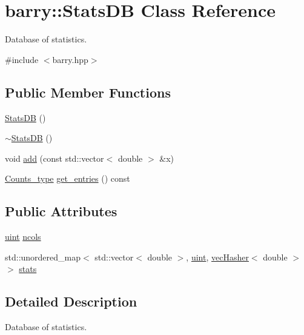 \hypertarget{classbarry_1_1_stats_d_b}{}\section{barry\+:\+:Stats\+DB Class Reference}
\label{classbarry_1_1_stats_d_b}


Database of statistics.  




{\ttfamily \#include $<$barry.\+hpp$>$}

\subsection*{Public Member Functions}
\begin{DoxyCompactItemize}
\item 
\hyperlink{classbarry_1_1_stats_d_b_a917ba8ccacb9dce050c481eb8a6d3c22}{Stats\+DB} ()
\item 
\hyperlink{classbarry_1_1_stats_d_b_a7d511a6eeeae101e18ae47ca616ad204}{$\sim$\+Stats\+DB} ()
\item 
void \hyperlink{classbarry_1_1_stats_d_b_a8f2d22df8ecf8f12bc54157e86d34696}{add} (const std\+::vector$<$ double $>$ \&x)
\item 
\hyperlink{namespacebarry_a3e2d8c3b6cf602107559d4237d9f1315}{Counts\+\_\+type} \hyperlink{classbarry_1_1_stats_d_b_a396e0921c34a854320a8027ce0f29278}{get\+\_\+entries} () const
\end{DoxyCompactItemize}
\subsection*{Public Attributes}
\begin{DoxyCompactItemize}
\item 
\hyperlink{namespacebarry_a11dfc53ddb4672278319aa04f1e09a6c}{uint} \hyperlink{classbarry_1_1_stats_d_b_a72aa06a48053cf79c4be7f821f83bd9b}{ncols}
\item 
std\+::unordered\+\_\+map$<$ std\+::vector$<$ double $>$, \hyperlink{namespacebarry_a11dfc53ddb4672278319aa04f1e09a6c}{uint}, \hyperlink{structbarry_1_1vec_hasher}{vec\+Hasher}$<$ double $>$ $>$ \hyperlink{classbarry_1_1_stats_d_b_a37af92a5d40cd2582446d86209ea7f26}{stats}
\end{DoxyCompactItemize}


\subsection{Detailed Description}
Database of statistics. 

